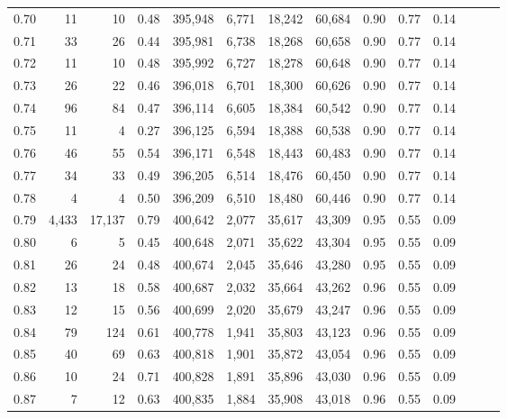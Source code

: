 \begin{tabular}{rrrrrrrrrrrrrr}
0.70 &      11 &      10 &  0.48 &  395,948 &    6,771 &  18,242 &  60,684 &  0.90 &  0.77 &      0.14 \\
0.71 &      33 &      26 &  0.44 &  395,981 &    6,738 &  18,268 &  60,658 &  0.90 &  0.77 &      0.14 \\
0.72 &      11 &      10 &  0.48 &  395,992 &    6,727 &  18,278 &  60,648 &  0.90 &  0.77 &      0.14 \\
0.73 &      26 &      22 &  0.46 &  396,018 &    6,701 &  18,300 &  60,626 &  0.90 &  0.77 &      0.14 \\
0.74 &      96 &      84 &  0.47 &  396,114 &    6,605 &  18,384 &  60,542 &  0.90 &  0.77 &      0.14 \\
0.75 &      11 &       4 &  0.27 &  396,125 &    6,594 &  18,388 &  60,538 &  0.90 &  0.77 &      0.14 \\
0.76 &      46 &      55 &  0.54 &  396,171 &    6,548 &  18,443 &  60,483 &  0.90 &  0.77 &      0.14 \\
0.77 &      34 &      33 &  0.49 &  396,205 &    6,514 &  18,476 &  60,450 &  0.90 &  0.77 &      0.14 \\
0.78 &       4 &       4 &  0.50 &  396,209 &    6,510 &  18,480 &  60,446 &  0.90 &  0.77 &      0.14 \\
0.79 &   4,433 &  17,137 &  0.79 &  400,642 &    2,077 &  35,617 &  43,309 &  0.95 &  0.55 &      0.09 \\
0.80 &       6 &       5 &  0.45 &  400,648 &    2,071 &  35,622 &  43,304 &  0.95 &  0.55 &      0.09 \\
0.81 &      26 &      24 &  0.48 &  400,674 &    2,045 &  35,646 &  43,280 &  0.95 &  0.55 &      0.09 \\
0.82 &      13 &      18 &  0.58 &  400,687 &    2,032 &  35,664 &  43,262 &  0.96 &  0.55 &      0.09 \\
0.83 &      12 &      15 &  0.56 &  400,699 &    2,020 &  35,679 &  43,247 &  0.96 &  0.55 &      0.09 \\
0.84 &      79 &     124 &  0.61 &  400,778 &    1,941 &  35,803 &  43,123 &  0.96 &  0.55 &      0.09 \\
0.85 &      40 &      69 &  0.63 &  400,818 &    1,901 &  35,872 &  43,054 &  0.96 &  0.55 &      0.09 \\
0.86 &      10 &      24 &  0.71 &  400,828 &    1,891 &  35,896 &  43,030 &  0.96 &  0.55 &      0.09 \\
0.87 &       7 &      12 &  0.63 &  400,835 &    1,884 &  35,908 &  43,018 &  0.96 &  0.55 &      0.09 \\

\end{tabular}

